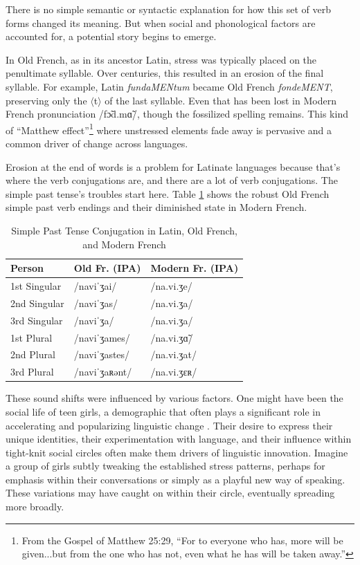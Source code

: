There is no simple semantic or syntactic explanation for how this set of verb forms changed its meaning. But when social and phonological factors are accounted for, a potential story begins to emerge.

In Old French, as in its ancestor Latin, stress was typically placed on the penultimate syllable. Over centuries, this resulted in an erosion of the final syllable. For example, Latin \textit{fundaMENtum} became Old French \textit{fondeMENT}, preserving only the $\langle$t$\rangle$ of the last syllable. Even that has been lost in Modern French pronunciation /fɔ̃d.mɑ̃/, though the fossilized spelling remains. This kind of ``Matthew effect''\footnote{From the Gospel of Matthew 25:29, ``For to everyone who has, more will be given...but from the one who has not, even what he has will be taken away.''} where unstressed elements fade away is pervasive and a common driver of change across languages.

Erosion at the end of words is a problem for Latinate languages because that's where the verb conjugations are, and there are a lot of verb conjugations. The simple past tense's troubles start here. Table \ref{table:past_tense_conjugation} shows the robust Old French simple past verb endings and their diminished state in Modern French. 

\begin{table}[ht]
\centering
\begin{tabular}{lll}
\hline
\textbf{Person} & \textbf{Old Fr. (IPA)} & \textbf{Modern Fr. (IPA)} \\
\hline
1st Singular & /naviˈʒai/ & /na.vi.ʒe/ \\
2nd Singular  & /naviˈʒas/ & /na.vi.ʒa/ \\
3rd Singular  & /naviˈʒa/ & /na.vi.ʒa/ \\
1st Plural &  /naviˈʒames/ & /na.vi.ʒɑ̃/ \\
2nd Plural &  /naviˈʒastes/ & /na.vi.ʒat/ \\
3rd Plural &  /naviˈʒaʀənt/ & /na.vi.ʒɛʀ/ \\
\hline
\end{tabular}
\caption{Simple Past Tense Conjugation in Latin, Old French, and Modern French}
\label{table:past_tense_conjugation}
\end{table}

These sound shifts were influenced by various factors. One might have been the social life of teen girls, a demographic that often plays a significant role in accelerating and popularizing linguistic change \citep{labov2001}. Their desire to express their unique identities, their experimentation with language, and their influence within tight-knit social circles often make them drivers of linguistic innovation. Imagine a group of girls subtly tweaking the established stress patterns, perhaps for emphasis within their conversations or simply as a playful new way of speaking. These variations may have caught on within their circle, eventually spreading more broadly.

